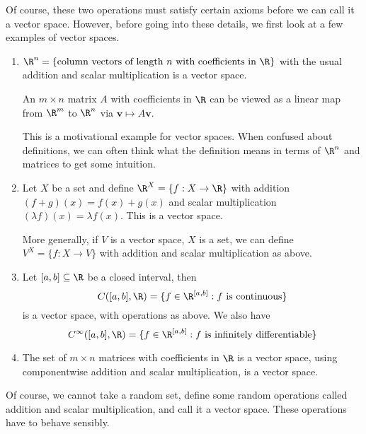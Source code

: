 \documentclass[a4paper]{article}
\begin{document}
Of course, these two operations must satisfy certain axioms before we can call it a vector space. However, before going into these details, we first look at a few examples of vector spaces.

\begin{eg}\leavevmode
  \begin{enumerate}
    \item $\R^n = \{\text{column vectors of length }n\text{ with coefficients in }\R\}$ with the usual addition and scalar multiplication is a vector space.

      An $m\times n$ matrix $A$ with coefficients in $\R$ can be viewed as a linear map from $\R^m$ to $\R^n$ via $\mathbf{v} \mapsto A\mathbf{v}$.

      This is a motivational example for vector spaces. When confused about definitions, we can often think what the definition means in terms of $\R^n$ and matrices to get some intuition.

    \item Let $X$ be a set and define $\R^X = \{f: X\to \R\}$ with addition $(f + g)(x) = f(x) + g(x)$ and scalar multiplication $(\lambda f)(x) = \lambda f(x)$. This is a vector space.

      More generally, if $V$ is a vector space, $X$ is a set, we can define $V^X = \{f: X \to V\}$ with addition and scalar multiplication as above.
    \item Let $[a, b]\subseteq \R$ be a closed interval, then
      \[
        C([a, b], \R) = \{f\in \R^{[a,b]}: f\text{ is continuous}\}
      \]
      is a vector space, with operations as above. We also have
      \[
        C^{\infty}([a, b], \R) = \{f\in \R^{[a,b]}: f\text{ is infinitely differentiable}\}
      \]
    \item The set of $m\times n$ matrices with coefficients in $\R$ is a vector space, using componentwise addition and scalar multiplication, is a vector space.
  \end{enumerate}
\end{eg}

Of course, we cannot take a random set, define some random operations called addition and scalar multiplication, and call it a vector space. These operations have to behave sensibly.
\end{document}
